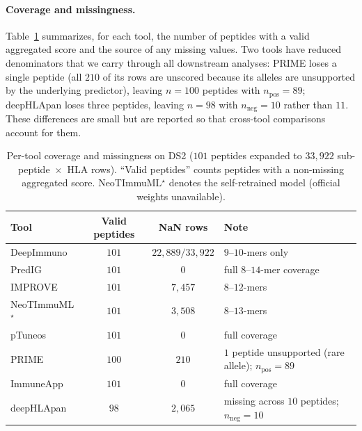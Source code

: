 \paragraph{Coverage and missingness.} Table~\ref{tab:coverage} summarizes, for
each tool, the number of peptides with a valid aggregated score and the source
of any missing values. Two tools have reduced denominators that we carry through
all downstream analyses: PRIME loses a single peptide (all $210$ of its rows are
unscored because its alleles are unsupported by the underlying predictor),
leaving $n=100$ peptides with $n_{\mathrm{pos}}=89$; deepHLApan loses three
peptides, leaving $n=98$ with $n_{\mathrm{neg}}=10$ rather than $11$. These
differences are small but are reported so that cross-tool comparisons account for
them.

\begin{table}[t]
\centering
\caption{Per-tool coverage and missingness on DS2 ($101$ peptides expanded to
$33{,}922$ sub-peptide~$\times$~HLA rows). ``Valid peptides'' counts peptides
with a non-missing aggregated score. NeoTImmuML$^\star$ denotes the
self-retrained model (official weights unavailable).}
\label{tab:coverage}
\begin{tabular}{lccl}
\toprule
Tool & Valid peptides & NaN rows & Note \\
\midrule
DeepImmuno        & $101$ & $22{,}889/33{,}922$ & $9$--$10$-mers only \\
PredIG            & $101$ & $0$                 & full $8$--$14$-mer coverage \\
IMPROVE           & $101$ & $7{,}457$           & $8$--$12$-mers \\
NeoTImmuML$^\star$ & $101$ & $3{,}508$          & $8$--$13$-mers \\
pTuneos           & $101$ & $0$                 & full coverage \\
PRIME             & $100$ & $210$               & $1$ peptide unsupported (rare allele); $n_{\mathrm{pos}}=89$ \\
ImmuneApp         & $101$ & $0$                 & full coverage \\
deepHLApan        & $98$  & $2{,}065$           & missing across $10$ peptides; $n_{\mathrm{neg}}=10$ \\
\bottomrule
\end{tabular}
\end{table}
